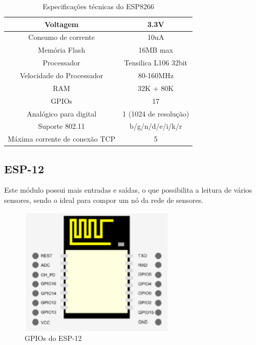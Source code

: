 \begin{table}[H]
\centering
\caption{Especificações técnicas do ESP8266}
\begin{tabular}{c|c}
\hline
Voltagem 						& 3.3V 					\\\hline
Consumo de corrente 			& 10uA 					\\\hline
Memória Flash 					& 16MB max				\\\hline
Processador 					& Tensilica L106 32bit	\\\hline
Velocidade do Processador 		& 80-160MHz				\\\hline
RAM 							& 32K + 80K 			\\\hline
GPIOs 							& 17		 			\\\hline
Analógico para digital 			& 1 (1024 de resolução)	\\\hline
Suporte 802.11 					& b/g/n/d/e/i/k/r		\\\hline
Máxima corrente de conexão TCP	& 5						\\\hline
\end{tabular}
\label{tab:esp8266}
\end{table}


\subsection{ESP-12}

Este módulo possui mais entradas e saídas, o que possibilita a leitura de vários sensores, sendo o ideal para compor um nó da rede de sensores.

\begin{figure}[H]
\centering
\includegraphics[scale=1]{./04-figuras/esp-12.png}
\begingroup
\caption{GPIOs do ESP-12}
\vspace{-\baselineskip}
\label{fig:esp12-gpios}
\endgroup
\end{figure}

